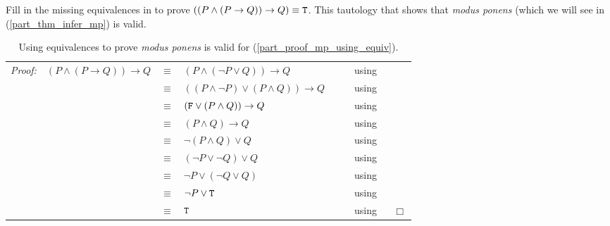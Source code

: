 \begin{act}
\begin{actpart}
        \item \label{part_proof_mp_using_equiv} Fill in the missing equivalences in  to prove $((P \land (P \to Q)) \to Q) \equiv \texttt{T}$. This tautology that shows that \emph{modus ponens} (which we will see in  (\ref{part_thm_infer_mp}) is valid.
                \begin{table}[hbtp]
                    \centering
                    \begin{tabular}{lrclll}
                         \emph{Proof:} & $ (P \land (P \to Q)) \to Q$ & $\equiv$ & $(P \land (\neg P \lor Q)) \to Q$ & ~\hspace{.25in}~& using \underline{\hspace{.75in}} \\ 
                         & & $\equiv$ & $((P \land \neg P) \lor (P \land Q)) \to Q$ && using \underline{\hspace{.75in}} \\
                         & & $\equiv$ & $(\texttt{F} \lor (P \land Q)) \to Q$ && using \underline{\hspace{.75in}}  \\ 
                         & & $\equiv$ & $(P \land Q) \to Q$ && using \underline{\hspace{.75in}}\\ 
                         & & $\equiv$ & $\neg(P \land Q) \lor Q$ && using \underline{\hspace{.75in}} \\
                         & & $\equiv$ & $(\neg P \lor \neg Q) \lor Q$ && using \underline{\hspace{.75in}} \\
                         & & $\equiv$ & $\neg P \lor (\neg Q \lor Q)$ && using \underline{\hspace{.75in}} \\
                         & & $\equiv$ & $\neg P \lor \texttt{T}$ && using \underline{\hspace{.75in}} \\
                         & & $\equiv$ & $\texttt{T}$ && using \underline{\hspace{.75in}} ~ \hfill ~$\Box$ \\
                    \end{tabular}
                    \caption{Using equivalences to prove \emph{modus ponens} is valid for  (\ref{part_proof_mp_using_equiv}).}
                    \label{table_equiv_proof_mp}
                \end{table}
    \end{actpart}
\end{act}

